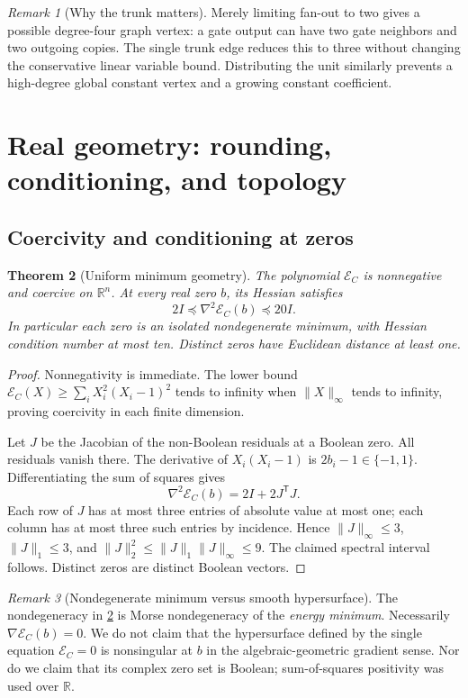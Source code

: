 \documentclass[11pt,letterpaper]{article}
\numberwithin{equation}{section}
\newtheorem{theorem}{Theorem}[section]
\theoremstyle{definition}
\theoremstyle{remark}
\newtheorem{remark}[theorem]{Remark}
\newcommand{\R}{\mathbb R}
\newcommand{\srcmark}[1]{\par\noindent{\small\itshape [source~#1]}\par}
\newcommand{\cE}{\mathcal E}
\begin{document}
\begin{remark}[Why the trunk matters]
Merely limiting fan-out to two gives a possible degree-four graph vertex:
a gate output can have two gate neighbors and two outgoing copies. The
single trunk edge reduces this to three without changing the conservative
linear variable bound. Distributing the unit similarly prevents a
high-degree global constant vertex and a growing constant coefficient.
\end{remark}

\section{Real geometry: rounding, conditioning, and topology}\label{pqc:ql:sec:geometry}
\srcmark{13}

\subsection{Coercivity and conditioning at zeros}
\begin{theorem}[Uniform minimum geometry]\label{pqc:ql:thm:hessian}
The polynomial $\cE_C$ is nonnegative and coercive on $\R^n$. At every real
zero $b$, its Hessian satisfies
\begin{equation}\label{pqc:ql:eq:hesszero}
 2I\preceq \nabla^2\cE_C(b)\preceq20I.
\end{equation}
In particular each zero is an isolated nondegenerate minimum, with Hessian
condition number at most ten. Distinct zeros have Euclidean distance at
least one.
\end{theorem}
\begin{proof}
Nonnegativity is immediate. The lower bound
$\cE_C(X)\ge\sum_iX_i^2(X_i-1)^2$ tends to infinity when
$\|X\|_\infty$ tends to infinity, proving coercivity in each finite dimension.

Let $J$ be the Jacobian of the non-Boolean residuals at a Boolean zero.
All residuals vanish there. The derivative of $X_i(X_i-1)$ is
$2b_i-1\in\{-1,1\}$. Differentiating the sum of squares gives
\[
 \nabla^2\cE_C(b)=2I+2J^{\mathsf T}J.
\]
Each row of $J$ has at most three entries of absolute value at most one;
each column has at most three such entries by incidence. Hence
$\|J\|_\infty\le3$, $\|J\|_1\le3$, and
$\|J\|_2^2\le\|J\|_1\|J\|_\infty\le9$. The claimed spectral interval
follows. Distinct zeros are distinct Boolean vectors.
\end{proof}

\begin{remark}[Nondegenerate minimum versus smooth hypersurface]
The nondegeneracy in \cref{pqc:ql:thm:hessian} is Morse nondegeneracy of the
\emph{energy minimum}. Necessarily $\nabla\cE_C(b)=0$. We do not claim that
the hypersurface defined by the single equation $\cE_C=0$ is nonsingular
at $b$ in the algebraic-geometric gradient sense. Nor do we claim that its
complex zero set is Boolean; sum-of-squares positivity was used over $\R$.
\end{remark}
\end{document}
